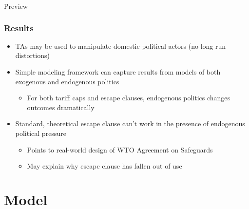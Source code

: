 \documentclass[handout]{beamer}
\begin{document}
\begin{frame}{Preview}
\frametitle{Results}

\pause
\begin{itemize}[<+->]
	\item TAs may be used to manipulate domestic political actors (no long-run distortions)
	\item Simple modeling framework can capture results from models of both exogenous and endogenous politics
		\begin{itemize}
			\item For both tariff caps and escape clauses, endogenous politics changes outcomes dramatically
		\end{itemize}
	\item Standard, theoretical escape clause can't work in the presence of endogenous political pressure
		\begin{itemize}
			\item Points to real-world design of WTO Agreement on Safeguards
			\item May explain why escape clause has fallen out of use
		\end{itemize}
\end{itemize}
\end{frame}

\section{Model}
\end{document}
